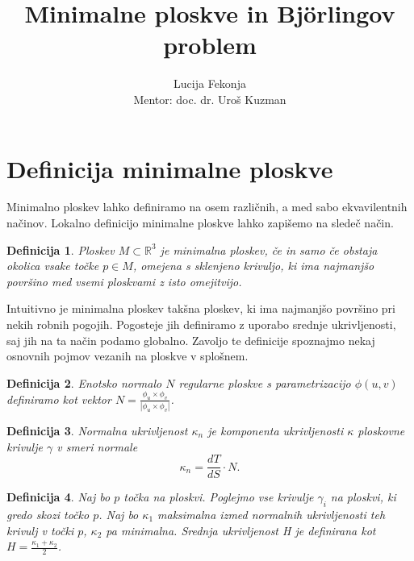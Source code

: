 \documentclass{article}
\author{Lucija Fekonja \\ Mentor: doc. dr. Uroš Kuzman}
\title{Minimalne ploskve in Björlingov problem}
\newtheorem{definicija}{Definicija}
\begin{document}
    \maketitle

    \section{Definicija minimalne ploskve}

        	Minimalno ploskev lahko definiramo na osem različnih, a med sabo ekvavilentnih načinov.
        	Lokalno definicijo minimalne ploskve lahko zapišemo na sledeč način.
        	
        	\begin{definicija}
        	    Ploskev $M \subset \mathbb{R}^3$ je \emph{minimalna ploskev}, če in samo če obstaja okolica vsake točke $p \in M$, omejena s 
        	    sklenjeno krivuljo, ki ima najmanjšo površino med vsemi ploskvami z isto omejitvijo.
        	\end{definicija}
        	
        	
        	Intuitivno je minimalna ploskev takšna ploskev, ki ima najmanjšo površino pri nekih robnih pogojih. 
        	Pogosteje jih definiramo z uporabo srednje ukrivljenosti, saj jih na ta način podamo globalno.
        	Zavoljo te definicije spoznajmo nekaj osnovnih pojmov vezanih na ploskve v splošnem.
    	
        	\begin{definicija}
        	    \emph{Enotsko normalo $N$} regularne ploskve s parametrizacijo $\phi(u, v)$ definiramo kot vektor $N = \frac{\phi_u \times \phi_v}{\left\lvert \phi_u \times \phi_v \right\rvert }$.
        	\end{definicija}
    	
        	\begin{definicija}
        	    \emph{Normalna ukrivljenost $\kappa_n$} je komponenta ukrivljenosti $\kappa$ ploskovne krivulje $\gamma$ v smeri normale
        	    $$ \kappa_n = \frac{dT}{dS} \cdot N. $$
        	\end{definicija}
    	
        	\begin{definicija}
        	    Naj bo $p$ točka na ploskvi. Poglejmo vse krivulje $\gamma_i$ na ploskvi, ki gredo skozi točko $p$. Naj bo $\kappa_1$ maksimalna izmed normalnih ukrivljenosti
        	    teh krivulj v točki $p$, $\kappa_2$ pa minimalna. 
        	    \emph{Srednja ukrivljenost H} je definirana kot $H = \frac{ \kappa_1 + \kappa_2 }{2}$.
        	\end{definicija}
        	
\end{document}
